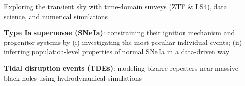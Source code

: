 


\begin{cvpubs}


\cvpub
{ %
\begin{cvitems}
\item Exploring the transient sky with time-domain surveys (ZTF \& LS4), data science, and numerical simulations
\item {\bf\color{darktext}Type Ia supernovae (SNe\,Ia)}: constraining their ignition mechanism and progenitor systems by (i) investigating the most peculiar individual events; (ii) inferring population-level properties of normal SNe\,Ia in a data-driven way
\item {\bf\color{darktext}Tidal disruption events (TDEs)}: modeling bizarre repeaters near massive black holes using hydrodynamical simulations
\end{cvitems}
}


\end{cvpubs}